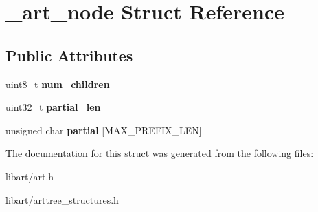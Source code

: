 \hypertarget{struct__art__node}{}\section{\+\_\+art\+\_\+node Struct Reference}
\label{struct__art__node}
\subsection*{Public Attributes}
\begin{DoxyCompactItemize}
\item 
\mbox{\label{struct__art__node_a568c806ac46af5fd3872558ceb52038d}} 
uint8\+\_\+t {\bfseries num\+\_\+children}
\item 
\mbox{\label{struct__art__node_a7701e425f3817f5d747bd6dcc9b301ea}} 
uint32\+\_\+t {\bfseries partial\+\_\+len}
\item 
\mbox{\label{struct__art__node_ad2fab3e7a29832c75b2bf8cfd1626799}} 
unsigned char {\bfseries partial} \mbox{[}M\+A\+X\+\_\+\+P\+R\+E\+F\+I\+X\+\_\+\+L\+EN\mbox{]}
\end{DoxyCompactItemize}


The documentation for this struct was generated from the following files\+:\begin{DoxyCompactItemize}
\item 
libart/art.\+h\item 
libart/arttree\+\_\+structures.\+h\end{DoxyCompactItemize}
